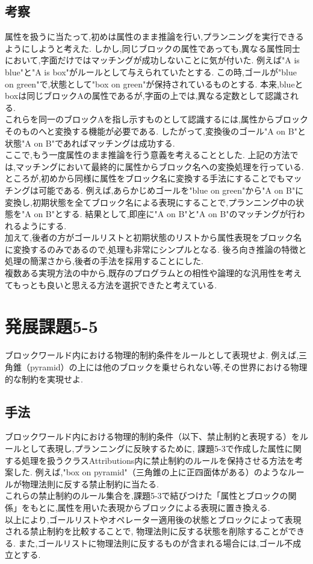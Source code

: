 \documentclass[uplatex,12pt]{jsarticle}
\begin{document}
\subsection{考察}
属性を扱うに当たって,初めは属性のまま推論を行い,プランニングを実行できるようにしようと考えた.
しかし,同じブロックの属性であっても,異なる属性同士において,字面だけではマッチングが成功しないことに気が付いた.
例えば"A is blue"と"A is box"がルールとして与えられていたとする.
この時,ゴールが"blue on green"で,状態として"box on green"が保持されているものとする.
本来,blueとboxは同じブロックAの属性であるが,字面の上では,異なる定数として認識される. \\
これらを同一のブロックAを指し示すものとして認識するには,属性からブロックそのものへと変換する機能が必要である.
したがって,変換後のゴール"A on B"と状態"A on B"であればマッチングは成功する. \\
ここで,もう一度属性のまま推論を行う意義を考えることとした.
上記の方法では,マッチングにおいて最終的に属性からブロック名への変換処理を行っている.
ところが,初めから同様に属性をブロック名に変換する手法にすることでもマッチングは可能である.
例えば,あらかじめゴールを"blue on green"から"A on B"に変換し,初期状態を全てブロック名による表現にすることで,プランニング中の状態を"A on B"とする.
結果として,即座に"A on B"と"A on B"のマッチングが行われるようにする. \\
加えて,後者の方がゴールリストと初期状態のリストから属性表現をブロック名に変換するのみであるので,処理も非常にシンプルとなる.
後ろ向き推論の特徴と処理の簡潔さから,後者の手法を採用することにした. \\
複数ある実現方法の中から,既存のプログラムとの相性や論理的な汎用性を考えてもっとも良いと思える方法を選択できたと考えている.


\section{発展課題5-5}
\begin{screen}
    ブロックワールド内における物理的制約条件をルールとして表現せよ.
    例えば,三角錐（pyramid）の上には他のブロックを乗せられない等,その世界における物理的な制約を実現せよ.
\end{screen}
\subsection{手法}
ブロックワールド内における物理的制約条件（以下、禁止制約と表現する）をルールとして表現し,プランニングに反映するために,
課題5-3で作成した属性に関する処理を扱うクラスAttributions内に禁止制約のルールを保持させる方法を考案した.
例えば,"box on pyramid"（三角錐の上に正四面体がある）のようなルールが物理法則に反する禁止制約に当たる. \\
これらの禁止制約のルール集合を,課題5-3で結びつけた「属性とブロックの関係」をもとに,属性を用いた表現からブロックによる表現に置き換える. \\
以上により,ゴールリストやオペレーター適用後の状態とブロックによって表現される禁止制約を比較することで,
物理法則に反する状態を削除することができる.
また,ゴールリストに物理法則に反するものが含まれる場合には,ゴール不成立とする. 
\end{document}
